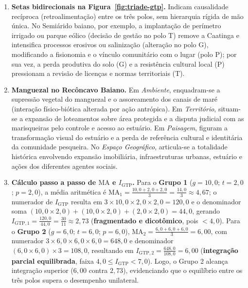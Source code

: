\begin{boxGabarito}
\begin{enumerate}[leftmargin=1.8em, itemsep=4pt, start=6]
  \item \textbf{Setas bidirecionais na Figura~\ref{fig:triade-gtp}.} Indicam causalidade recíproca (retroalimentação) entre os três polos, sem hierarquia rígida de mão única. No Semiárido baiano, por exemplo, a implantação de perímetro irrigado ou parque eólico (decisão de gestão no polo T) remove a Caatinga e intensifica processos erosivos ou salinização (alteração no polo G), modificando a fisionomia e o vínculo comunitário com o lugar (polo P); por sua vez, a perda produtiva do solo (G) e a resistência cultural local (P) pressionam a revisão de licenças e normas territoriais (T).
  \item \textbf{Manguezal no Recôncavo Baiano.}
  Em \textit{Ambiente}, enquadram-se a supressão vegetal do manguezal e o assoreamento dos canais de maré (interação físico-biótica alterada por ação antrópica). Em \textit{Território}, situam-se a expansão de loteamentos sobre área protegida e a disputa judicial com as marisqueiras pelo controle e acesso ao estuário. Em \textit{Paisagem}, figuram a transformação visual do estuário e a perda de referência cultural e identitária da comunidade pesqueira. No \textit{Espaço Geográfico}, articula-se a totalidade histórica envolvendo expansão imobiliária, infraestruturas urbanas, estuário e ações dos diferentes agentes sociais.
  \item \textbf{Cálculo passo a passo de $\text{MA}$ e $I_{\text{GTP}}$.}
  Para o \textbf{Grupo 1} ($g = 10{,}0$; $t = 2{,}0$; $p = 2{,}0$), a média aritmética é $\text{MA}_1 = \frac{10{,}0 + 2{,}0 + 2{,}0}{3} = \frac{14{,}0}{3} \approx 4{,}67$; o numerador de $I_{\text{GTP}}$ resulta em $3 \times 10{,}0 \times 2{,}0 \times 2{,}0 = 120{,}0$ e o denominador soma $(10{,}0 \times 2{,}0) + (10{,}0 \times 2{,}0) + (2{,}0 \times 2{,}0) = 44{,}0$, gerando $I_{\text{GTP}, 1} = \frac{120{,}0}{44{,}0} = \frac{30}{11} \approx 2{,}73$ (\textbf{fragmentado e dicotômico}, pois $< 4{,}0$). Para o \textbf{Grupo 2} ($g = 6{,}0$; $t = 6{,}0$; $p = 6{,}0$), $\text{MA}_2 = \frac{6{,}0 + 6{,}0 + 6{,}0}{3} = 6{,}00$, com numerador $3 \times 6{,}0 \times 6{,}0 \times 6{,}0 = 648{,}0$ e denominador $(6{,}0 \times 6{,}0) \times 3 = 108{,}0$, resultando em $I_{\text{GTP}, 2} = \frac{648{,}0}{108{,}0} = 6{,}00$ (\textbf{integração parcial equilibrada}, faixa $4{,}0 \le I_{\text{GTP}} < 7{,}0$). Logo, o Grupo 2 alcança integração superior ($6{,}00$ contra $2{,}73$), evidenciando que o equilíbrio entre os três polos supera o desempenho unilateral.

\end{enumerate}
\end{boxGabarito}
